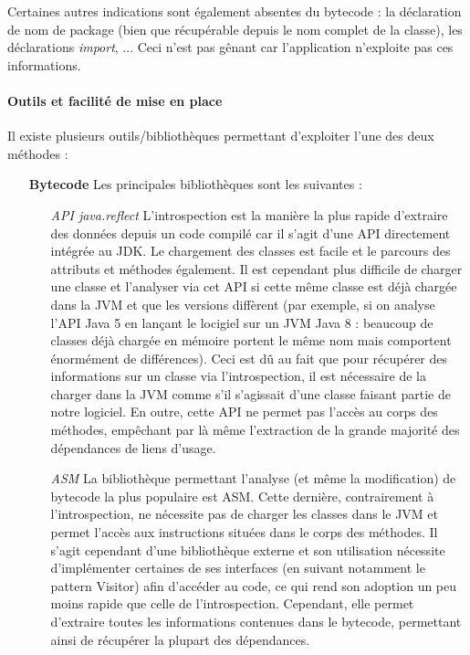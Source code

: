 \documentclass{scrartcl}
\begin{document}
    Certaines autres indications sont également absentes du bytecode : la déclaration de nom de package (bien que récupérable depuis le nom complet de la classe), les déclarations \textit{import}, ... Ceci n'est pas gênant car l'application n'exploite pas ces informations.
    
    \paragraph{Outils et facilité de mise en place} Il existe plusieurs outils/bibliothèques permettant d'exploiter l'une des deux méthodes :
        \begin{itemize}
            \item[\textbf{Bytecode}] Les principales bibliothèques sont les suivantes :
            \begin{itemize}
                \item[\textit{API java.reflect}\footnotemark] L'introspection est la manière la plus rapide d'extraire des données depuis un code compilé car il s'agit d'une API directement intégrée au JDK. Le chargement des classes est facile et le parcours des attributs et méthodes également. Il est cependant plus difficile de charger une classe et l'analyser via cet API si cette même classe est déjà chargée dans la JVM et que les versions diffèrent (par exemple, si on analyse l'API Java 5 en lançant le locigiel sur un JVM Java 8 : beaucoup de classes déjà chargée en mémoire portent le même nom mais comportent énormément de différences). Ceci est dû au fait que pour récupérer des informations sur un classe via l'introspection, il est nécessaire de la charger dans la JVM comme s'il s'agissait d'une classe faisant partie de notre logiciel. En outre, cette API ne permet pas l'accès au corps des méthodes, empêchant par là même l'extraction de la grande majorité des dépendances de liens d'usage.
                \item[\textit{ASM}\footnotemark] La bibliothèque permettant l'analyse (et même la modification) de bytecode la plus populaire est ASM. Cette dernière, contrairement à l'introspection, ne nécessite pas de charger les classes dans le JVM et permet l'accès aux instructions situées dans le corps des méthodes. Il s'agit cependant d'une bibliothèque externe et son utilisation nécessite d'implémenter certaines de ses interfaces (en suivant notamment le pattern Visitor) afin d'accéder au code, ce qui rend son adoption un peu moins rapide que celle de l'introspection. Cependant, elle permet d'extraire toutes les informations contenues dans le bytecode, permettant ainsi de récupérer la plupart des dépendances.

\end{itemize}
\end{itemize}
\end{document}
